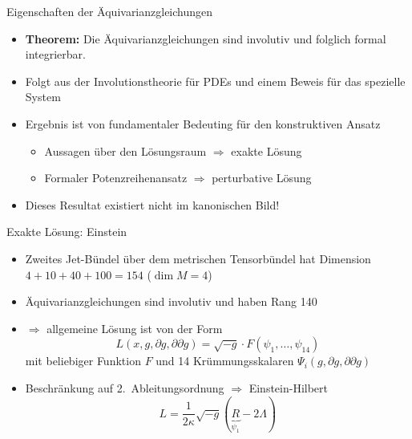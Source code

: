\documentclass{beamer}
\begin{document}
    \begin{frame}{Eigenschaften der Äquivarianzgleichungen}
        \begin{itemize}
            \item \textbf{Theorem:} Die Äquivarianzgleichungen sind
            \alert{involutiv} und folglich \alert{formal integrierbar}. \pause
            \item Folgt aus der Involutionstheorie für PDEs und einem Beweis für das spezielle System \pause
            \item Ergebnis ist von fundamentaler Bedeuting für den konstruktiven Ansatz \pause
            \begin{itemize}
                \item Aussagen über den Lösungsraum $\Rightarrow$ exakte Lösung\pause
                \item Formaler Potenzreihenansatz $\Rightarrow$ perturbative Lösung \pause
            \end{itemize}
            \item Dieses Resultat existiert nicht im kanonischen Bild!
        \end{itemize}
    \end{frame}

    \begin{frame}{Exakte Lösung: Einstein}
        \begin{itemize}
            \item Zweites Jet-Bündel über dem metrischen Tensorbündel hat
            Dimension $4+10+40+100 = 154$ ($\dim M = 4$) \pause
            \item Äquivarianzgleichungen sind involutiv und haben Rang 140 \pause
            \item $\Rightarrow$ allgemeine Lösung ist von der Form
            \[ L(x,g,\partial g,\partial\partial g) = \sqrt{-g} \cdot F(\psi_1,\ldots,\psi_{14}) \]
            mit beliebiger Funktion $F$ und 14 Krümmungsskalaren $\Psi_i(g,\partial g,\partial\partial g)$ \pause
            \item Beschränkung auf 2.\ Ableitungsordnung $\Rightarrow$ \alert{Einstein-Hilbert}
            \[ L = \frac{1}{2\kappa}\sqrt{-g}(\underbrace{R}_{\psi_1} - 2\Lambda)\]
        \end{itemize}
    \end{frame}
\end{document}
